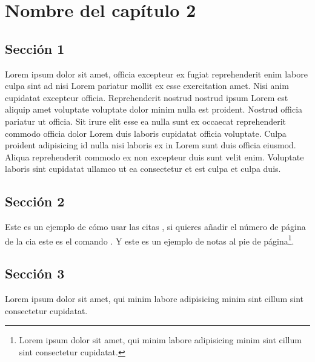 \documentclass[12pt,twoside,left5mm,doublespacing]{bookest}
\begin{document}
\chapter{Nombre del capítulo 2}

\section{Sección 1}

Lorem ipsum dolor sit amet, officia excepteur ex fugiat reprehenderit enim labore culpa sint ad nisi Lorem pariatur mollit ex esse exercitation amet. Nisi anim cupidatat excepteur officia. Reprehenderit nostrud nostrud ipsum Lorem est aliquip amet voluptate voluptate dolor minim nulla est proident. Nostrud officia pariatur ut officia. Sit irure elit esse ea nulla sunt ex occaecat reprehenderit commodo officia dolor Lorem duis laboris cupidatat officia voluptate. Culpa proident adipisicing id nulla nisi laboris ex in Lorem sunt duis officia eiusmod. Aliqua reprehenderit commodo ex non excepteur duis sunt velit enim. Voluptate laboris sint cupidatat ullamco ut ea consectetur et est culpa et culpa duis.


\section{Sección 2}
Este es un ejemplo de cómo usar las citas
\parencite{Sartlp}, si quieres añadir el número de página de
la cia este es el comando \parencite[50-60]{parmh}. Y este
es un ejemplo de notas al pie de página\footnote{Lorem ipsum
	dolor sit amet, qui minim labore adipisicing minim sint
	cillum sint consectetur cupidatat.}.


\section{Sección 3}

Lorem ipsum dolor sit amet, qui minim labore adipisicing minim sint cillum sint consectetur cupidatat.



\backmatter
{}




\printbibliography %


\end{document}
